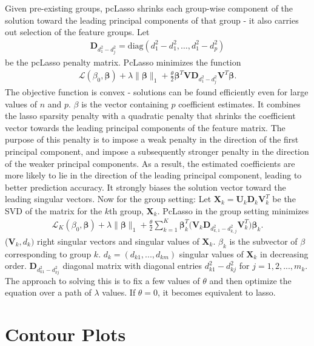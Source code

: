 \documentclass[10pt]{article}
\begin{document}
Given pre-existing groups, pcLasso shrinks each group-wise component of the solution toward the leading principal components of that group - it also carries out selection of the feature groups.
Let 
\begin{align*}
    \mathbf{D}_{d_1^2 - d_j^2} = \mathrm{diag}(d_1^2 - d_1^2, \ldots, d_1^2 - d_p^2)
\end{align*}
be the pcLasso penalty matrix. PcLasso minimizes the function 
\begin{align}
\label{pclasso}
\mathcal{L}(\beta_0, \bm{\beta}) + \lambda \| \bm{\beta} \|_1 + \frac{\theta}{2} \bm{\beta}^T \mathbf{V} \mathbf{D}_{d_1^2 - d_j^2} \mathbf{V}^T \bm{\beta}.
\end{align}
The objective function is convex - solutions can be found efficiently even for large values of $n$ and $p$. $\beta$ is the vector containing $p$ coefficient estimates. It combines the lasso sparsity penalty with a quadratic penalty that shrinks the coefficient vector towards the leading principal components of the feature matrix. The purpose of this penalty is to impose a weak penalty in the direction of the first principal component, and impose a subsequently stronger penalty in the direction of the weaker principal components. As a result, the estimated coefficients are more likely to lie in the direction of the leading principal component, leading to better prediction accuracy. It strongly biases the solution vector toward the leading singular vectors.
Now for the group setting:
Let $\mathbf{X}_k = \mathbf{U}_k \mathbf{D}_k \mathbf{V}_k^T$ be the SVD of the matrix for the $k$th group, $\mathbf{X}_k$. PcLasso in the group setting minimizes 
\begin{align}
\label{pclassogroup}
\mathcal{L}_K(\beta_0, \bm{\beta}) + \lambda \| \bm{\beta} \|_1 + \frac{\theta}{2} \sum_{k=1}^K \bm{\beta}_k^T \big( \mathbf{V}_k \mathbf{D}_{d_{k,1}^2 - d_{k,j}^2} \mathbf{V}_k^T \big) \bm{\beta}_k.
\end{align}
($\mathbf{V}_k, d_k)$ right singular vectors and singular values of $\mathbf{X}_k$. $\beta_k$ is the subvector of $\beta$ corresponding to group $k$. $d_k = (d_{k1},...,d_{km})$ singular values of $\mathbf{X}_k$ in decreasing order. $\mathbf{D}_{d^2_{k1}-d^2_{kj}}$ diagonal matrix with diagonal entries ${d^2_{k1}-d^2_{kj}}$ for $j=1,2,...,m_k$.
The approach to solving this is to fix a few values of $\theta$ and then optimize the equation over a path of $\lambda$ values. If $\theta = 0$, it becomes equivalent to lasso. 
    
\section{Contour Plots}
\end{document}
